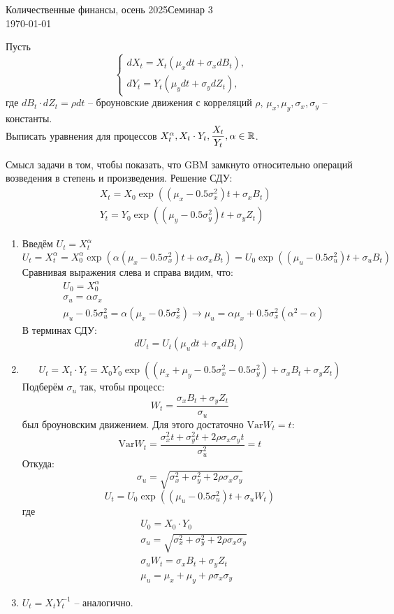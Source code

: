 \documentclass[12pt]{article}
\begin{document}
\noindent Количественные финансы, осень 2025\hfill Семинар 3\\
\today

\hrulefill
\begin{problem}
    Пусть
    $$\begin{cases}
        dX_t = X_t (\mu_x dt + \sigma_x dB_t), \\
        dY_t = Y_t (\mu_y dt + \sigma_y dZ_t),
    \end{cases}$$
    где $dB_t\cdot dZ_t = \rho dt$ -- броуновские движения с корреляций $\rho$, $\mu_x, \mu_y, \sigma_x, \sigma_y$ -- константы.
    \\ Выписать уравнения для процессов $X_t^{\alpha}, X_t \cdot Y_t, \dfrac{X_t}{Y_t}, \alpha \in \mathbb{R}$.
\end{problem}
Смысл задачи в том, чтобы показать, что GBM замкнуто относительно операций возведения в степень и произведения. Решение СДУ:
\begin{align*}
    &X_t = X_0 \exp((\mu_x - 0.5 \sigma_x^2) t + \sigma_x B_t) \\
    &Y_t = Y_0 \exp((\mu_y - 0.5 \sigma_y^2) t + \sigma_y Z_t)
\end{align*}
\begin{enumerate}
    \item Введём $U_t = X_t^{\alpha}$
    $$U_t = X_t^{\alpha} = X_0^{\alpha} \exp(\alpha (\mu_x - 0.5 \sigma_x^2) t + \alpha \sigma_x B_t)
    = U_0 \exp((\mu_u - 0.5 \sigma_u^2) t + \sigma_u B_t)$$
    Сравнивая выражения слева и справа видим, что:
    \begin{align*}
    &U_0 = X_0^{\alpha}\\
    &\sigma_u = \alpha \sigma_x\\
    &\mu_u - 0.5 \sigma_u^2 = \alpha (\mu_x - 0.5 \sigma_x^2) \to \mu_u = \alpha \mu_x + 0.5 \sigma_x^2 \left( \alpha^2 - \alpha \right) 
\end{align*}
    В терминах СДУ:
    $$
        dU_t = U_t \left( \mu_u dt + \sigma_u dB_t \right)
    $$
\item 
$$U_t = X_t \cdot Y_t
 = X_0 Y_0 \exp \left( (\mu_x + \mu_y - 0.5 \sigma_x^2 - 0.5 \sigma_y^2) + \sigma_x B_t + \sigma_y Z_t\right)
$$Подберём $\sigma_u$ так, чтобы процесс:
$$
    W_t = \dfrac{\sigma_x B_t + \sigma_y Z_t}{\sigma_u}
$$был броуновским движением. Для этого достаточно $\mathrm{Var} W_t = t$:
$$
    \mathrm{Var} W_t = \dfrac{\sigma_x^2 t + \sigma_y^2 t + 2\rho \sigma_x \sigma_y t}{\sigma^2_u} = t
$$Откуда:
$$
    \sigma_u = \sqrt{\sigma_x^2 + \sigma_y^2 + 2\rho \sigma_x \sigma_y}
$$
$$
    U_t = U_0 \exp((\mu_u - 0.5 \sigma_u^2) t + \sigma_u W_t)
$$где
\begin{align*}
    &U_0 = X_0 \cdot Y_0 \\
    &\sigma_u = \sqrt{\sigma_x^2 + \sigma_y^2 + 2\rho \sigma_x \sigma_y} \\
    &\sigma_u W_t = \sigma_x B_t + \sigma_y Z_t \\
    &\mu_u = \mu_x + \mu_y + \rho \sigma_x \sigma_y 
\end{align*}
\item $U_t = X_t Y_t^{-1}$ -- аналогично.
\end{enumerate}
\end{document}
